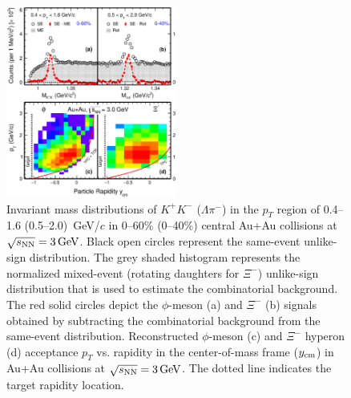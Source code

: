 \documentclass[%
 reprint,	
showpacs,
 amsmath,amssymb,
 aps,
 prc,
]{revtex4-1}
\begin{document}
\begin{figure}
\centering
\hspace*{-4mm}
\includegraphics[width=0.50\textwidth]{fig/fig1_signal.eps}
  \caption{Invariant mass distributions of $K^+K^-$ ($\Lambda\pi^-$) in the $p_T$ region of 0.4--1.6 (0.5--2.0) \,GeV/$c$ in 0--60\% (0--40\%) central Au+Au collisions at ${\sqrt{s_{\rm NN}} = \rm{3\,GeV}}$. Black open circles represent the same-event unlike-sign distribution. The grey shaded histogram represents the normalized mixed-event (rotating daughters for $\Xi^-$) unlike-sign distribution that is used to estimate the combinatorial background. The red solid circles depict the $\phi$-meson (a) and $\Xi^-$ (b) signals obtained by subtracting the combinatorial background from the same-event distribution. Reconstructed $\phi$-meson (c) and $\Xi^-$ hyperon (d) acceptance $p_T$ vs. rapidity in the center-of-mass frame ($y_{\rm cm}$) in Au+Au collisions at ${\sqrt{s_{\rm NN}} = \rm{3\,GeV}}$. The dotted line indicates the target rapidity location.}
\label{fig:phiSignal} 
\end{figure}
\end{document}

